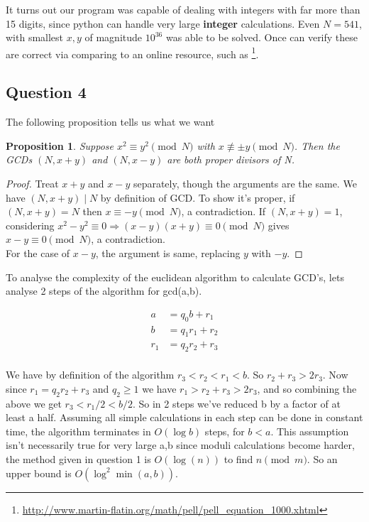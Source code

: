 \documentclass[10pt,a4paper]{report}
\newtheorem*{prop}{Proposition}
\begin{document}
It turns out our program was capable of dealing with integers with far more than 15 digits, since python can handle very large \textbf{integer} calculations. Even $N=541$, with smallest $x,y$ of magnitude $10^{36}$ was able to be solved. Once can verify these are correct via comparing to an online resource, such as \footnote{\url{http://www.martin-flatin.org/math/pell/pell_equation_1000.xhtml}}.

\subsection*{Question 4}

The following proposition tells us what we want

\begin{prop}
Suppose $x^2  \equiv y^2 \pmod N$ with $x \not\equiv \pm y \pmod N$. Then the GCDs $(N, x + y)$ and $(N, x - y)$ are both proper divisors of N.
\end{prop}
\begin{proof}
Treat $x+y$ and $x-y$ separately, though the arguments are the same.
We have $(N, x+y) \mid N$ by definition of GCD. To show it's proper, if $(N, x+y)=N$ then $x\equiv-y\pmod N$, a contradiction. If $(N, x+y)=1$, considering $x^2-y^2\equiv 0\Rightarrow (x-y)(x+y)\equiv 0 \pmod N$ gives $x-y\equiv0 \pmod N$, a contradiction. \\
For the case of $x-y$, the argument is  same, replacing $y$ with $-y$.
\end{proof}

To analyse the complexity of the euclidean algorithm to calculate GCD's, lets analyse 2 steps of the algorithm for gcd(a,b).

\begin{align*}
a&=q_0b+r_1\\
b&=q_1r_1+r_2\\
r_1&=q_2r_2+r_3\\
\end{align*}

We have by definition of the algorithm $ r_3 < r_2 < r_1 < b$. So $r_2 + r_3 > 2r_3$. Now since $r_1=q_2r_2+r_3$ and $q_2\geq 1$ we have $r_1 > r_2 + r_3 > 2r_3$, and so combining the above we get $r_3 < r_1/2 < b/2$. So in 2 steps we've reduced b by a factor of at least a half. Assuming all simple calculations in each step can be done in constant time, the algorithm terminates in $O(\log{b})$ steps, for $b<a$. This assumption isn't necessarily true for very large a,b since moduli calculations become harder, the method given in question 1 is $O(\log(n))$ to find $n \pmod m$. So an upper bound is  $O(\log^2{\min(a,b)})$.\\
\end{document}

